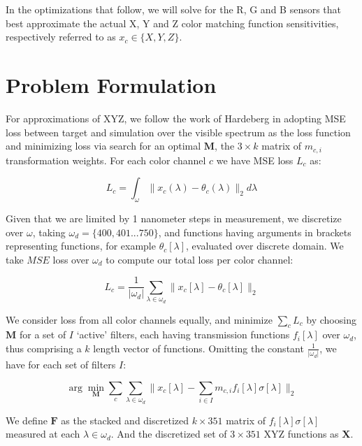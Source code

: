 In the optimizations that follow, we will solve for the R, G and B sensors that best approximate the actual X, Y and Z color matching function sensitivities, respectively referred to as $x_c \in \{X,Y,Z\}$.


\section{Problem Formulation}

For approximations of XYZ, we follow the work of Hardeberg \cite{Filterselection} in adopting MSE loss between target and simulation over the visible spectrum as the loss function and minimizing loss via search for an optimal $\boldsymbol{M}$, the $3 \times k$ matrix of $m_{c,i}$ transformation weights. For each color channel $c$ we have MSE loss $L_c$ as:

\begin{equation}
    L_c = \int_{\omega}\|{x_c}(\lambda)-\theta_c(\lambda)\|_2 d\lambda
    \label{eq:5}
\end{equation}

Given that we are limited by 1 nanometer steps in measurement, we discretize over $\omega$, taking $\omega_d = \{400,401...750\}$, and functions having arguments in brackets representing functions, for example $\theta_c[\lambda]$, evaluated over discrete domain. We take $MSE$ loss over $\omega_d$ to compute our total loss per color channel:

\begin{equation}
    L_c = \frac{1}{| \omega_d |}\sum_{\lambda \in \omega_d}\|{x_c}[\lambda]-\theta_{c}[\lambda]\|_2
    \label{eq:6}
\end{equation}

We consider loss from all color channels equally, and minimize $\sum_c L_c$ by choosing $\boldsymbol{M}$ for a set of $I$ `active' filters, each having transmission functions $f_i[\lambda]$ over $\omega_d$, thus comprising a $k$ length vector of functions.
Omitting the constant $\frac{1}{|\omega_d|}$, we have for each set of filters $I$:

\begin{equation}
    \arg\min_{\mathbf{M}} \sum_c \sum_{\lambda \in \omega_d}\|{x_c}[\lambda]-\sum_{i \in I}m_{c,i}{f}_i[\lambda]\sigma[\lambda]\|_2
    \label{eq:7}
\end{equation}

We define $\boldsymbol{F}$ as the stacked and discretized $k\times 351$ matrix of $f_i[\lambda]\sigma[\lambda]$ measured at each $\lambda \in \omega_d$. 
And the discretized set of $3 \times 351$ XYZ functions as $\mathbf{X}$. 

